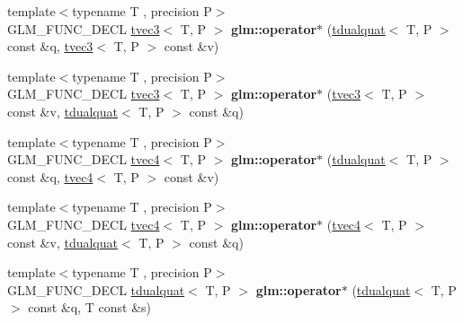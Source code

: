 \begin{DoxyCompactItemize}
{\footnotesize template$<$typename T , precision P$>$ }\\G\+L\+M\+\_\+\+F\+U\+N\+C\+\_\+\+D\+E\+CL \hyperlink{structglm_1_1tvec3}{tvec3}$<$ T, P $>$ {\bfseries glm\+::operator$\ast$} (\hyperlink{structglm_1_1tdualquat}{tdualquat}$<$ T, P $>$ const \&q, \hyperlink{structglm_1_1tvec3}{tvec3}$<$ T, P $>$ const \&v)
\item 
\mbox{\label{group__gtx__dual__quaternion_gae28bc49be7b6f8b6ba650d412875e8fa}} 
{\footnotesize template$<$typename T , precision P$>$ }\\G\+L\+M\+\_\+\+F\+U\+N\+C\+\_\+\+D\+E\+CL \hyperlink{structglm_1_1tvec3}{tvec3}$<$ T, P $>$ {\bfseries glm\+::operator$\ast$} (\hyperlink{structglm_1_1tvec3}{tvec3}$<$ T, P $>$ const \&v, \hyperlink{structglm_1_1tdualquat}{tdualquat}$<$ T, P $>$ const \&q)
\item 
\mbox{\label{group__gtx__dual__quaternion_ga42c6aa511f21ed63387aa007422d1986}} 
{\footnotesize template$<$typename T , precision P$>$ }\\G\+L\+M\+\_\+\+F\+U\+N\+C\+\_\+\+D\+E\+CL \hyperlink{structglm_1_1tvec4}{tvec4}$<$ T, P $>$ {\bfseries glm\+::operator$\ast$} (\hyperlink{structglm_1_1tdualquat}{tdualquat}$<$ T, P $>$ const \&q, \hyperlink{structglm_1_1tvec4}{tvec4}$<$ T, P $>$ const \&v)
\item 
\mbox{\label{group__gtx__dual__quaternion_ga5dd5d4e3c6c7905f5db7f3c0366ffcc3}} 
{\footnotesize template$<$typename T , precision P$>$ }\\G\+L\+M\+\_\+\+F\+U\+N\+C\+\_\+\+D\+E\+CL \hyperlink{structglm_1_1tvec4}{tvec4}$<$ T, P $>$ {\bfseries glm\+::operator$\ast$} (\hyperlink{structglm_1_1tvec4}{tvec4}$<$ T, P $>$ const \&v, \hyperlink{structglm_1_1tdualquat}{tdualquat}$<$ T, P $>$ const \&q)
\item 
\mbox{\label{group__gtx__dual__quaternion_ga5251d67271c42cf52227b6254f3fc8ed}} 
{\footnotesize template$<$typename T , precision P$>$ }\\G\+L\+M\+\_\+\+F\+U\+N\+C\+\_\+\+D\+E\+CL \hyperlink{structglm_1_1tdualquat}{tdualquat}$<$ T, P $>$ {\bfseries glm\+::operator$\ast$} (\hyperlink{structglm_1_1tdualquat}{tdualquat}$<$ T, P $>$ const \&q, T const \&s)
\item 
\mbox{\label{group__gtx__dual__quaternion_ga0aedf77f3e7d45464501570c28df0ed7}} 

\end{DoxyCompactItemize}
